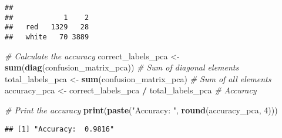 \documentclass[
]{article}
\newenvironment{Shaded}{\begin{snugshade}}{\end{snugshade}}
\newcommand{\AttributeTok}[1]{\textcolor[rgb]{0.13,0.29,0.53}{#1}}
\newcommand{\CommentTok}[1]{\textcolor[rgb]{0.56,0.35,0.01}{\textit{#1}}}
\newcommand{\DecValTok}[1]{\textcolor[rgb]{0.00,0.00,0.81}{#1}}
\newcommand{\FunctionTok}[1]{\textcolor[rgb]{0.13,0.29,0.53}{\textbf{#1}}}
\newcommand{\NormalTok}[1]{#1}
\newcommand{\OtherTok}[1]{\textcolor[rgb]{0.56,0.35,0.01}{#1}}
\newcommand{\SpecialCharTok}[1]{\textcolor[rgb]{0.81,0.36,0.00}{\textbf{#1}}}
\newcommand{\StringTok}[1]{\textcolor[rgb]{0.31,0.60,0.02}{#1}}
\begin{document}
\begin{Shaded}
\end{Shaded}

\begin{verbatim}
##        
##            1    2
##   red   1329   28
##   white   70 3889
\end{verbatim}

\begin{Shaded}
\begin{Highlighting}[]
\CommentTok{\# Calculate the accuracy}
\NormalTok{correct\_labels\_pca }\OtherTok{\textless{}{-}} \FunctionTok{sum}\NormalTok{(}\FunctionTok{diag}\NormalTok{(confusion\_matrix\_pca))  }\CommentTok{\# Sum of diagonal elements}
\NormalTok{total\_labels\_pca }\OtherTok{\textless{}{-}} \FunctionTok{sum}\NormalTok{(confusion\_matrix\_pca)  }\CommentTok{\# Sum of all elements}
\NormalTok{accuracy\_pca }\OtherTok{\textless{}{-}}\NormalTok{ correct\_labels\_pca }\SpecialCharTok{/}\NormalTok{ total\_labels\_pca  }\CommentTok{\# Accuracy}

\CommentTok{\# Print the accuracy}
\FunctionTok{print}\NormalTok{(}\FunctionTok{paste}\NormalTok{(}\StringTok{"Accuracy: "}\NormalTok{, }\FunctionTok{round}\NormalTok{(accuracy\_pca, }\DecValTok{4}\NormalTok{)))}
\end{Highlighting}
\end{Shaded}

\begin{verbatim}
## [1] "Accuracy:  0.9816"
\end{verbatim}
\end{document}
